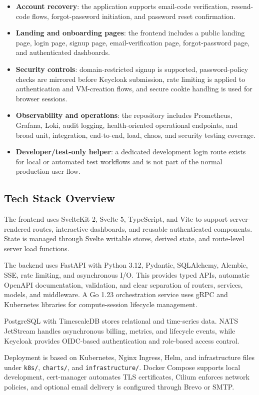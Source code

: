 \documentclass[12pt,a4paper]{article}
\begin{document}
\begin{itemize}[leftmargin=*]
    \item \textbf{Account recovery}: the application supports email-code verification, resend-code flows, forgot-password initiation, and password reset confirmation.
    \item \textbf{Landing and onboarding pages}: the frontend includes a public landing page, login page, signup page, email-verification page, forgot-password page, and authenticated dashboards.
    \item \textbf{Security controls}: domain-restricted signup is supported, password-policy checks are mirrored before Keycloak submission, rate limiting is applied to authentication and VM-creation flows, and secure cookie handling is used for browser sessions.
    \item \textbf{Observability and operations}: the repository includes Prometheus, Grafana, Loki, audit logging, health-oriented operational endpoints, and broad unit, integration, end-to-end, load, chaos, and security testing coverage.
    \item \textbf{Developer/test-only helper}: a dedicated development login route exists for local or automated test workflows and is not part of the normal production user flow.
\end{itemize}

\subsection{Tech Stack Overview}
The frontend uses SvelteKit 2, Svelte 5, TypeScript, and Vite to support server-rendered routes, interactive dashboards, and reusable authenticated components. State is managed through Svelte writable stores, derived state, and route-level server load functions.

The backend uses FastAPI with Python 3.12, Pydantic, SQLAlchemy, Alembic, SSE, rate limiting, and asynchronous I/O. This provides typed APIs, automatic OpenAPI documentation, validation, and clear separation of routers, services, models, and middleware. A Go 1.23 orchestration service uses gRPC and Kubernetes libraries for compute-session lifecycle management.

PostgreSQL with TimescaleDB stores relational and time-series data. NATS JetStream handles asynchronous billing, metrics, and lifecycle events, while Keycloak provides OIDC-based authentication and role-based access control.

Deployment is based on Kubernetes, Nginx Ingress, Helm, and infrastructure files under \texttt{k8s/}, \texttt{charts/}, and \texttt{infrastructure/}. Docker Compose supports local development, cert-manager automates TLS certificates, Cilium enforces network policies, and optional email delivery is configured through Brevo or SMTP.
\end{document}
